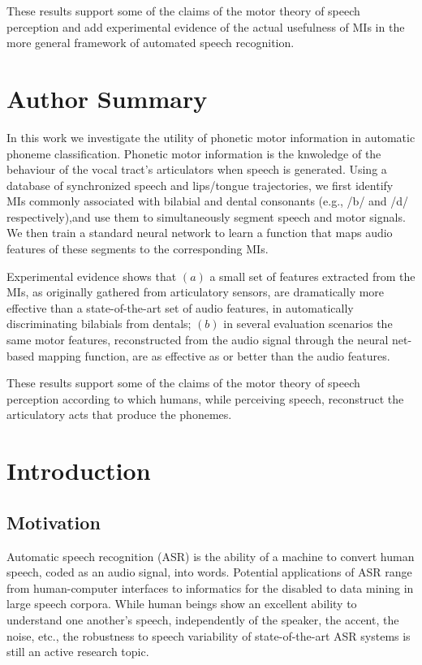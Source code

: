 \documentclass[10pt]{article}
\begin{document}
  These results support some of the claims of the motor theory of speech perception
  and add experimental evidence of the actual usefulness of MIs in the more general
  framework of automated speech recognition.

\section*{Author Summary}
In this work we investigate the utility of phonetic motor information in automatic 
phoneme classification. Phonetic motor information is the knwoledge of the behaviour 
of the vocal tract's articulators when speech is generated. Using a database of synchronized 
speech and lips/tongue trajectories, we first identify MIs commonly associated with bilabial and 
dental consonants (e.g., /b/ and /d/ respectively),and use them to simultaneously segment speech 
and motor signals. We then train a standard neural network to learn a function that maps audio 
features of these segments to the corresponding MIs.

Experimental evidence shows that
$(a)$ a small set of features extracted from the MIs, as originally gathered from
    articulatory sensors, are dramatically more effective than a state-of-the-art
    set of audio features, in automatically discriminating bilabials from dentals;
  $(b)$ in several evaluation scenarios the same motor features, reconstructed from the audio signal through the neural net-	     based mapping function, are as effective as  or better than the audio features.

These results support some of the claims of the motor theory of speech perception according to which 
humans, while perceiving speech, reconstruct the articulatory acts that produce the phonemes.

\section*{Introduction}
\subsection*{Motivation}
Automatic speech recognition (ASR) is the ability of a machine
to convert human speech, coded as an audio signal, into words.
Potential applications of ASR range from human-computer interfaces
to informatics for the disabled to data mining in large speech corpora.
While human beings show an excellent ability to understand one another's speech,
independently of the speaker, the accent, the noise, etc., the robustness to
speech variability of state-of-the-art ASR systems is still an active research
topic.
\end{document}
